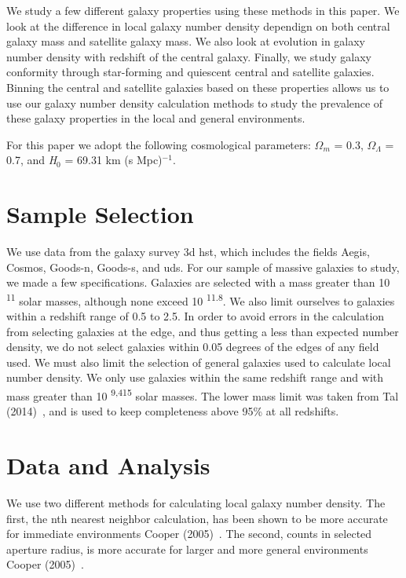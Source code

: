 \documentclass[apj]{emulateapj}
\begin{document}
We study a few different galaxy properties using these methods in this paper. We look at the difference in local galaxy number density dependign on both central galaxy mass and  satellite galaxy mass. We also look at evolution in galaxy number density with redshift of the central galaxy. Finally, we study galaxy conformity through star-forming and quiescent central and satellite galaxies. Binning the central and satellite galaxies based on these properties allows us to use our galaxy number density calculation methods to study the prevalence of these galaxy properties in the local and general environments.

For this paper we adopt the following cosmological parameters: $\Omega_{m}$ = 0.3, $\Omega_{\Lambda}$ = 0.7, and \textit{H}$_{0}$ = 69.31 km (s Mpc)$^{-1}$.

\section{Sample Selection}

We use data from the galaxy survey 3d hst, which includes the fields Aegis, Cosmos, Goods-n, Goods-s, and uds. For our sample of massive galaxies to study, we made a few specifications. Galaxies are selected with a mass greater than 10 \textsuperscript{11} solar masses, although none exceed 10 \textsuperscript{11.8}. We also limit ourselves to galaxies within a redshift range of 0.5 to 2.5. In order to avoid errors in the calculation from selecting galaxies at the edge, and thus getting a less than expected number density, we do not select galaxies within 0.05 degrees of the edges of any field used.
We must also limit the selection of general galaxies used to calculate local number density. We only use galaxies within the same redshift range and with mass greater than 10 \textsuperscript{9,415} solar masses. The lower mass limit was taken from Tal (2014)~\cite{2014ApJ...789..164T}, and is used to keep completeness above 95\% at all redshifts.

\section{Data and Analysis}

We use two different methods for calculating local galaxy number density. The first, the nth nearest neighbor calculation, has been shown to be more accurate for immediate environments Cooper (2005)~\cite{2005ApJ...634..833C}. The second, counts in selected aperture radius, is more accurate for larger and more general environments Cooper (2005)~\cite{2005ApJ...634..833C}.
\end{document}
